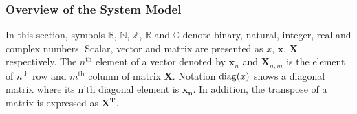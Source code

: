 

\subsubsection{Overview of the System Model}
\label{sec:ctx_scma_overview}

In this section, symbols $\mathbb{B}$, $\mathbb{N}$, $\mathbb{Z}$, $\mathbb{R}$
and $\mathbb{C}$ denote binary, natural, integer, real and complex numbers.
Scalar, vector and matrix are presented as $x$, $\bm{x}$, $\bm{X}$ respectively.
The $n^\text{th}$ element of a vector denoted by $\bm{x}_n$ and $\bm{X}_{n,m}$
is the element of $n^\text{th}$ row and $m^\text{th}$ column of matrix $\bm{X}$.
Notation $\operatorname{diag}(x)$ shows a diagonal matrix where its n'th diagonal element is
$\bm{x_n}$. In addition, the transpose of a matrix is expressed as $\bm{X^T}$.

